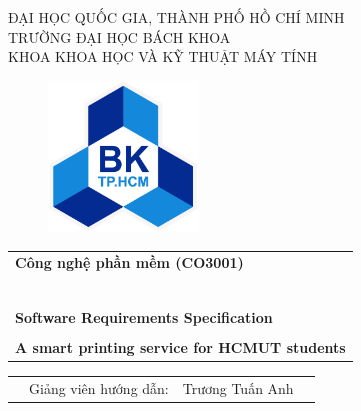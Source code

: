 \begin{titlepage}
	\begin{center}
		ĐẠI HỌC QUỐC GIA, THÀNH PHỐ HỒ CHÍ MINH \\
		TRƯỜNG ĐẠI HỌC BÁCH KHOA \\
		KHOA KHOA HỌC VÀ KỸ THUẬT MÁY TÍNH
	\end{center}

	\begin{figure}[h!]
		\begin{center}
			\includegraphics[width=4cm]{Images/bachkhoa_logo.png}
		\end{center}
	\end{figure}

	\begin{center}
		\begin{tabular}{@{}p{15cm}@{}}
			\multicolumn{1}{l}{\textbf{{\Large Công nghệ phần mềm (CO3001)}}}                      \\
			~~                                                                                     \\
			\hline
			\\
			\multicolumn{1}{l}{\textbf{{\Large Software Requirements Specification }}}             \\
			\\
			\parbox{15cm}{\centering \textbf{{\Huge A smart printing service for HCMUT students}}} \\

			\\
			\hline
		\end{tabular}
	\end{center}

	\vspace{2cm}

	\begin{table}[h]
		\begin{tabular}{rrll}

			\hspace{5 cm} & Giảng viên hướng dẫn: & Trương Tuấn Anh     &         \\


\end{tabular}
\end{table}
\end{titlepage}

